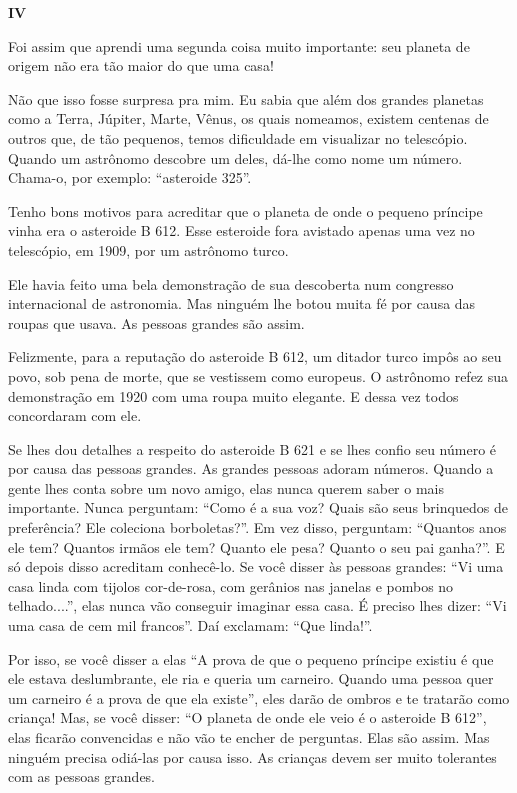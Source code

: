 \begin{Parallel}[p]{}{}
{\textbf{IV}

Foi assim que aprendi uma segunda coisa muito importante: seu planeta de
origem não era tão maior do que uma casa!

Não que isso fosse surpresa pra mim. Eu sabia que além dos grandes
planetas como a Terra, Júpiter, Marte, Vênus, os quais nomeamos, existem
centenas de outros que, de tão pequenos, temos dificuldade em visualizar
no telescópio. Quando um astrônomo descobre um deles, dá-lhe como nome
um número. Chama-o, por exemplo: ``asteroide 325''.

Tenho bons motivos para acreditar que o planeta de onde o pequeno
príncipe vinha era o asteroide B 612. Esse esteroide fora avistado
apenas uma vez no telescópio, em 1909, por um astrônomo turco.

Ele havia feito uma bela demonstração de sua descoberta num congresso
internacional de astronomia. Mas ninguém lhe botou muita fé por causa
das roupas que usava. As pessoas grandes são assim.

Felizmente, para a reputação do asteroide B 612, um ditador turco impôs
ao seu povo, sob pena de morte, que se vestissem como europeus. O
astrônomo refez sua demonstração em 1920 com uma roupa muito elegante. E
dessa vez todos concordaram com ele.

Se lhes dou detalhes a respeito do asteroide B 621 e se lhes confio seu
número é por causa das pessoas grandes. As grandes pessoas adoram
números. Quando a gente lhes conta sobre um novo amigo, elas nunca
querem saber o mais importante. Nunca perguntam: ``Como é a sua voz?
Quais são seus brinquedos de preferência? Ele coleciona borboletas?''.
Em vez disso, perguntam: ``Quantos anos ele tem? Quantos irmãos ele tem?
Quanto ele pesa? Quanto o seu pai ganha?''. E só depois disso acreditam
conhecê-lo. Se você disser às pessoas grandes: ``Vi uma casa linda com
tijolos cor-de-rosa, com gerânios nas janelas e pombos no telhado....'',
elas nunca vão conseguir imaginar essa casa. É preciso lhes dizer: ``Vi
uma casa de cem mil francos''. Daí exclamam: ``Que linda!''.

Por isso, se você disser a elas ``A prova de que o pequeno príncipe
existiu é que ele estava deslumbrante, ele ria e queria um carneiro.
Quando uma pessoa quer um carneiro é a prova de que ela existe'', eles
darão de ombros e te tratarão como criança! Mas, se você disser: ``O
planeta de onde ele veio é o asteroide B 612'', elas ficarão convencidas
e não vão te encher de perguntas. Elas são assim. Mas ninguém precisa
odiá-las por causa isso. As crianças devem ser muito tolerantes com as
pessoas grandes.

}
\end{Parallel}
